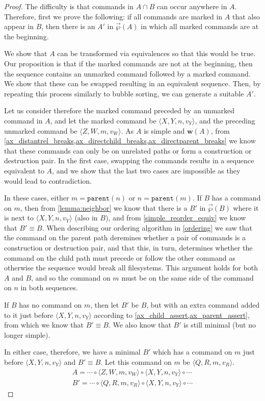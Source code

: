 \documentclass[12pt]{article}
\newcommand{\parent}{\mathtt{parent}}
\newcommand{\valvy}{v_Y} %
\newcommand{\valvw}{v_W}
\newcommand{\valvr}{v_R}
\newcommand{\caaaa}[4]{\langle{#1,#2,#3,#4}\rangle}
\newcommand{\cxynv}{\caaaa{X}{Y}{n}{\valvy}}
\newcommand{\czwmv}{\caaaa{Z}{W}{m}{\valvw}}
\newcommand{\cqrmv}{\caaaa{Q}{R}{m}{\valvr}}
\newcommand{\cc}{\circ} %
\newcommand{\workssign}{\mathbf{w}}
\newcommand{\works}[1]{\workssign({#1})}
\newcommand{\orderset}[1]{\vec{\wp}({#1})}
\theoremstyle{definition}
\begin{document}
\begin{proof}
The difficulty is that commands in $A\cap B$ can occur anywhere in $A$.
Therefore, first we prove the following:
if all commands are marked in $A$ that also appear in $B$,
then there is an $A'$ in $\orderset{A}$ in which all marked commands are at the beginning.

We show that $A$ can be transformed via equivalences so that this would be true.
Our proposition is that if the marked commands are not at the beginning, then
the sequence contains an unmarked command followed by a marked command.
We show that these can be swapped resulting in an equivalent sequence.
Then, by repeating this process similarly to bubble sorting, we can generate 
a suitable $A'$.

\medskip

Let us consider therefore the marked command preceded by an unmarked command in $A$,
and let the marked command be $\cxynv$, 
and the preceding unmarked command be $\czwmv$.
As $A$ is simple and $\works{A}$, from 
\cref{ax_distantrel_breaks,ax_directchild_breaks,ax_directparent_breaks}
we know that these commands can only be on unrelated paths or form a construction or destruction pair.
In the first case, swapping the commands results in a sequence equivalent to $A$,
and we show that the last two cases are impossible as they would lead to contradiction.

In these cases, either $m=\parent(n)$ or $n=\parent(m)$.
If $B$ has a command on $m$, then
from \cref{lemma:neighbor}
we know that there is a $B'$ in $\orderset{B}$ where it is next to $\cxynv$ (also in $B$),
and from \cref{simple_reorder_equiv} we know that $B'\equiv B$.
When describing our ordering algorithm in \cref{ordering} we saw
that the command on the parent path deremines whether a pair of commands
is a construction or destruction pair,
and that this, in turn, determines whether the command on the child path must
precede or follow the other command as otherwise the sequence would break all filesystems.
This argument holds for both $A$ and $B$, and so the command on $m$ must be on
the same side of the command on $n$ in both sequences.

If $B$ has no command on $m$, then let $B'$ be $B$, 
but with an extra command added to it just before $\cxynv$
according to \cref{ax_child_assert,ax_parent_assert}, 
from which we know that $B'\equiv B$.
We also know that $B'$ is still minimal (but no longer simple).

In either case, therefore,
we have a minimal $B'$ which has a command on $m$ just before $\cxynv$ and $B'\equiv B$.
Let this command on $m$ be $\cqrmv$.
\begin{gather*}
A = \cdots\cc  \czwmv\cc  \cxynv\cc  \cdots \\
B' = \cdots\cc  \cqrmv\cc  \cxynv\cc  \cdots
\end{gather*}


\end{proof}
\end{document}
